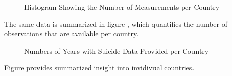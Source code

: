\begin{figure}
    \centering
    \caption{Histogram Showing the Number of Measurements per Country}
    \label{fig:observations-histogram}
\end{figure}

The same data is summarized in figure , which quantifies the number of observations that are available per country.

\begin{figure}
    \centering
    \caption{Numbers of Years with Suicide Data Provided per Country}
    \label{fig:years-with-data}
\end{figure}

Figure  provides summarized insight into invidivual countries.
